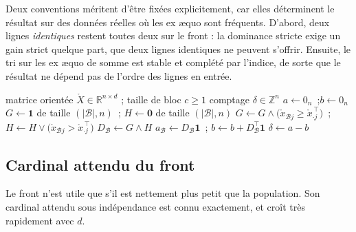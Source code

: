 \documentclass[11pt,a4paper]{article}
\theoremstyle{definition}
\theoremstyle{remark}
\newcommand{\R}{\mathbb{R}}
\newcommand{\Z}{\mathbb{Z}}
\newcommand{\abs}[1]{\left\lvert #1 \right\rvert}
\newcommand{\Xor}{\mathring{X}}
\begin{document}
\bigskip

Deux conventions méritent d'être fixées explicitement, car elles déterminent le résultat
sur des données réelles où les ex \ae quo sont fréquents. D'abord, deux lignes
\emph{identiques} restent toutes deux sur le front : la dominance stricte exige un gain
strict quelque part, que deux lignes identiques ne peuvent s'offrir. Ensuite, le tri sur
les ex \ae quo de somme est stable et complété par l'indice, de sorte que le résultat ne
dépend pas de l'ordre des lignes en entrée.

\bigskip

\begin{algorithm}[htbp]
  \caption{Comptage de dominance par blocs}
  \label{algo:comptage-blocs}
  \begin{algorithmic}[1]
    \Require matrice orientée $\Xor \in \R^{n \times d}$ ; taille de bloc $c \ge 1$
    \Ensure comptage $\delta \in \Z^n$
    \State $a \gets 0_n$~;\quad $b \gets 0_n$
      \Comment{$a_i = \abs{\mathcal{D}(i)}$, $b_i = \abs{\mathcal{A}(i)}$}
      \State $G \gets \mathbf{1}$ de taille $(\abs{\mathcal{B}}, n)$~;\quad
        $H \gets \mathbf{0}$ de taille $(\abs{\mathcal{B}}, n)$
        \State $G \gets G \wedge
          \big(\mathring{x}_{\mathcal{B}j} \ge \mathring{x}_{\cdot j}^{\,\top}\big)$~;\quad
          $H \gets H \vee
          \big(\mathring{x}_{\mathcal{B}j} > \mathring{x}_{\cdot j}^{\,\top}\big)$
      \EndFor
      \State $D_{\mathcal{B}} \gets G \wedge H$
      \State $a_{\mathcal{B}} \gets D_{\mathcal{B}}\mathbf{1}$~;\quad
        $b \gets b + D_{\mathcal{B}}^{\top}\mathbf{1}$
    \EndFor
    \State \Return $\delta \gets a - b$
  \end{algorithmic}
\end{algorithm}

\bigskip

\subsection{Cardinal attendu du front}
\label{sec:cardinal}

\medskip

Le front n'est utile que s'il est nettement plus petit que la population. Son cardinal
attendu sous indépendance est connu exactement, et croît très rapidement avec $d$.
\end{document}
